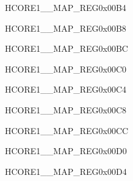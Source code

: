 \begin{register}{H}{CORE1\_\_MAP\_REG}{0x00B4}\label{regdesc:CORE1I2C1INTMAPREG}
\end{register}\vspace{-3em}


\begin{register}{H}{CORE1\_\_MAP\_REG}{0x00B8}\label{regdesc:CORE1TIMERGRP0T0INTMAPREG}
\end{register}\vspace{-3em}


\begin{register}{H}{CORE1\_\_MAP\_REG}{0x00BC}\label{regdesc:CORE1TIMERGRP0T1INTMAPREG}
\end{register}\vspace{-3em}


\begin{register}{H}{CORE1\_\_MAP\_REG}{0x00C0}\label{regdesc:CORE1TIMERGRP0WDTINTMAPREG}
\end{register}\vspace{-3em}


\begin{register}{H}{CORE1\_\_MAP\_REG}{0x00C4}\label{regdesc:CORE1TIMERGRP1T0INTMAPREG}
\end{register}\vspace{-3em}


\begin{register}{H}{CORE1\_\_MAP\_REG}{0x00C8}\label{regdesc:CORE1TIMERGRP1T1INTMAPREG}
\end{register}\vspace{-3em}


\begin{register}{H}{CORE1\_\_MAP\_REG}{0x00CC}\label{regdesc:CORE1TIMERGRP1WDTINTMAPREG}
\end{register}\vspace{-3em}


\begin{register}{H}{CORE1\_\_MAP\_REG}{0x00D0}\label{regdesc:CORE1LEDCINTMAPREG}
\end{register}\vspace{-3em}


\begin{register}{H}{CORE1\_\_MAP\_REG}{0x00D4}\label{regdesc:CORE1SYSTIMERTARGET0INTMAPREG}
\end{register}\vspace{-3em}


